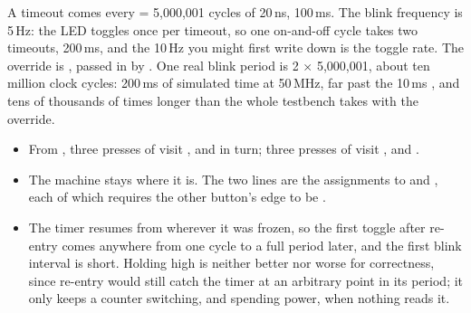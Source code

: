 A timeout comes every  = 5,000,001 cycles of 20\,ns, 100\,ms. The blink
frequency is 5\,Hz: the LED toggles once per timeout, so one on-and-off cycle takes two timeouts,
200\,ms, and the 10\,Hz you might first write down is the toggle rate.
The override is , passed in by
. One real blink period is 2 $\times$ 5,000,001, about ten million
clock cycles: 200\,ms of simulated time at 50\,MHz, far past the 10\,ms , and
tens of thousands of times longer than the whole testbench takes with the override.
\begin{itemize}
  \item From , three presses of  visit ,
     and  in turn; three presses of  visit
    ,  and .
  \item The machine stays where it is. The two lines are the assignments to  and
    , each of which requires the other button's edge to be .
  \item The timer resumes from wherever it was frozen, so the first toggle after re-entry comes
    anywhere from one cycle to a full period later, and the first blink interval is short. Holding
     high is neither better nor worse for correctness, since re-entry would still
    catch the timer at an arbitrary point in its period; it only keeps a counter switching, and
    spending power, when nothing reads it.
\end{itemize}

